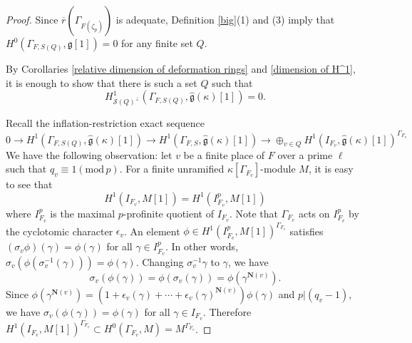 \documentclass[12pt,oneside,reqno]{amsart}
\theoremstyle{plain}
\begin{document}
	\begin{proof}
		Since $\overline{r}(\Gamma_{F(\zeta_p)})$ is adequate, Definition \ref{big}(1) and (3) imply that $H^0(\Gamma_{F,S(Q)},\mathfrak{g}[1])=0$ for any finite set $Q$.
		
		
		
		
		
		By Corollaries
		\ref{relative dimension of deformation rings}
		and
		\ref{dimension of H^1},
		it is enough to show that there is such a set $Q$ such that
		\[
		H^1_{\mathcal{S}(Q)^\perp}
		(\Gamma_{F,S(Q)},
		\widehat{\mathfrak{g}}(\kappa)[1])=0.
		\]
		
		
		
		
		Recall the inflation-restriction exact sequence 
		\[
		0
		\rightarrow
		H^1(\Gamma_{F,S(Q)},
		\widehat{\mathfrak{g}}(\kappa)[1])
		\rightarrow
		H^1(\Gamma_{F,S},
		\widehat{\mathfrak{g}}(\kappa)[1])
		\rightarrow
		\oplus_{v\in Q}
		H^1(I_{F_v},
		\widehat{\mathfrak{g}}(\kappa)[1])^{\Gamma_{F_v}}
		\]
		We have the following observation:
		let $v$ be a finite place of $F$ over a prime $\ell$
		such that
		$q_v\equiv1(\mathrm{mod}\,p)$.
		For a finite unramified
		$\kappa[\Gamma_{F_v}]$-module $M$,
		it is easy to see that
		\[
		H^1(I_{F_v},M[1])
		=
		H^1(I_{F_v}^p,M[1])
		\]
		where
		$I_{F_v}^p$ is the maximal
		$p$-profinite quotient of $I_{F_v}$.
		Note that $\Gamma_{F_v}$
		acts on
		$I_{F_v}^p$ by the cyclotomic character
		$\epsilon_v$.
		An element
		$\phi\in
		H^1(I_{F_v}^p,M[1])^{\Gamma_{F_v}}
		$
		satisfies
		$(\sigma_v\phi)(\gamma)=\phi(\gamma)$
		for all $\gamma\in I_{F_v}^p$.
		In other words,
		$\sigma_v(\phi(\sigma_v^{-1}(\gamma)))=\phi(\gamma)$.
		Changing $\sigma_v^{-1}\gamma$ to $\gamma$,
		we have
		\[
		\sigma_v(\phi(\gamma))
		=
		\phi(\sigma_v(\gamma))
		=
		\phi(\gamma^{\mathbf{N}(v)}).
		\]
		Since
		$\phi(\gamma^{\mathbf{N}(v)})
		=
		(1+\epsilon_v(\gamma)+\cdots+\epsilon_v(\gamma)^{\mathbf{N}(v)})
		\phi(\gamma)
		$
		and
		$p|(q_v-1)$,
		we have
		$\sigma_v(\phi(\gamma))
		=\phi(\gamma)$
		for all $\gamma\in I_{F_v}$.
		Therefore
		$H^1(I_{F_v},M[1])^{\Gamma_{F_v}}
		\subset
		H^0(\Gamma_{F_v},M)
		=
		M^{\Gamma_{F_v}}$.
		
		
		

\end{proof}
\end{document}
